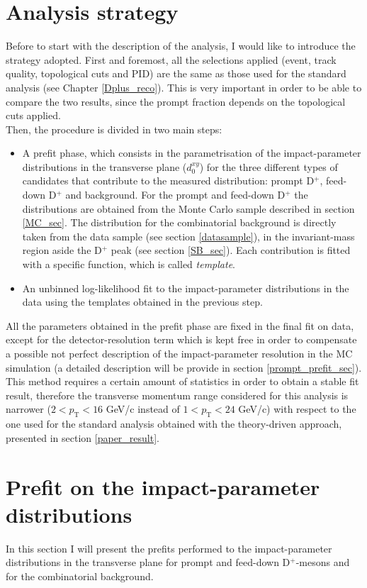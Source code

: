 \documentclass[b5paper,10pt,twoside,oldstyle,classica]{toptesi}
\newcommand{\pt}{p_\text{T}}
\begin{document}
\section{Analysis strategy}
Before to start with the description of the analysis, I would like to introduce the strategy adopted. First and foremost, all the selections applied (event, track quality, topological cuts and PID) are the same as those used for the standard analysis (see Chapter \ref{Dplus_reco}). This is very important in order to be able to compare the two results, since the prompt fraction depends on the topological cuts applied.\\ Then, the procedure is divided in two main steps: 
\begin{itemize}
 \item A prefit phase, which consists in the parametrisation of the impact-parameter distributions in the transverse plane ($d_{0}^{xy}$) for the three different types of candidates that contribute to the measured distribution: prompt D$^+$, feed-down D$^+$ and background. For the prompt and feed-down D$^+$ the distributions are obtained from the Monte Carlo sample described in section \ref{MC_sec}. The distribution for the combinatorial background is directly taken from the data sample (see section \ref{datasample}), in the invariant-mass region aside the D$^+$ peak (see section \ref{SB_sec}).
 Each contribution is fitted with a specific function, which is called \textit{template}.
 \item An unbinned log-likelihood fit to the impact-parameter distributions in the data using the templates obtained in the previous step.
\end{itemize}
All the parameters obtained in the prefit phase are fixed in the final fit on data, except for the detector-resolution term which is kept free in order to compensate a possible not perfect description of the impact-parameter resolution in the MC simulation (a detailed description will be provide in section \ref{prompt_prefit_sec}).\\ This method requires a certain amount of statistics in order to obtain a stable fit result, therefore the transverse momentum range considered for this analysis is narrower ($2<\pt<16$ GeV/c instead of $1<\pt<24$ GeV/c) with respect to the one used for the standard analysis obtained with the theory-driven approach, presented in section \ref{paper_result}. 
\section{Prefit on the impact-parameter distributions}
\label{prefit_sec}
In this section I will present the prefits performed to the impact-parameter distributions in the transverse plane for prompt and feed-down D$^+$-mesons and for the combinatorial background. 
\end{document}
